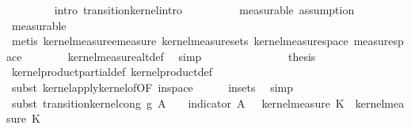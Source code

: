 \begin{isabellebody}
\ \ \ \ \ \ \ \isamarkupfalse%
\ {\isacharparenleft}{\kern0pt}intro\ transition{\isacharunderscore}{\kern0pt}kernel{\isachardot}{\kern0pt}intro{\isacharparenright}{\kern0pt}\isanewline
\ \ \ \ \ \ \ \ \isamarkupfalse%
\ {\isacharparenleft}{\kern0pt}measurable{\isacharcomma}{\kern0pt}\ assumption{\isacharparenright}{\kern0pt}\isanewline
\ \ \ \ \ \ \ \ \isamarkupfalse%
\ measurable\isanewline
\ \ \ \ \ \ \ \isamarkupfalse%
\ {\isacharparenleft}{\kern0pt}metis\ kernel{\isacharunderscore}{\kern0pt}measure{\isacharunderscore}{\kern0pt}emeasure\ kernel{\isacharunderscore}{\kern0pt}measure{\isacharunderscore}{\kern0pt}sets\ kernel{\isacharunderscore}{\kern0pt}measure{\isacharunderscore}{\kern0pt}space\ measure{\isacharunderscore}{\kern0pt}space{\isacharparenright}{\kern0pt}\isanewline
\ \ \ \ \ \ \isamarkupfalse%
\ kernel{\isacharunderscore}{\kern0pt}measure{\isacharunderscore}{\kern0pt}altdef\ \isamarkupfalse%
\ simp\isanewline
\ \ \ \ \ \ \isamarkupfalse%
\isanewline
\ \ \ \ \isamarkupfalse%
\isanewline
\ \ \isamarkupfalse%
\ {\isacharquery}{\kern0pt}thesis\isanewline
\ \ \ \ \isamarkupfalse%
\ kernel{\isacharunderscore}{\kern0pt}product{\isacharunderscore}{\kern0pt}partial{\isacharunderscore}{\kern0pt}def\ kernel{\isacharunderscore}{\kern0pt}product{\isacharunderscore}{\kern0pt}def\isanewline
\ \ \isamarkupfalse%
\ {\isacharparenleft}{\kern0pt}subst\ kernel{\isacharunderscore}{\kern0pt}apply{\isacharunderscore}{\kern0pt}kernel{\isacharunderscore}{\kern0pt}of{\isacharbrackleft}{\kern0pt}OF\ in{\isacharunderscore}{\kern0pt}space{\isacharbrackright}{\kern0pt}{\isacharparenright}{\kern0pt}\isanewline
\ \ \ \ \isamarkupfalse%
\ in{\isacharunderscore}{\kern0pt}sets\ \isamarkupfalse%
\ simp\isanewline
\ \ \ \ \ \isamarkupfalse%
\ {\isacharparenleft}{\kern0pt}subst\ transition{\isacharunderscore}{\kern0pt}kernel{\isacharunderscore}{\kern0pt}cong{\isacharbrackleft}{\kern0pt}\ g{\isacharequal}{\kern0pt}{\isachardoublequoteopen}{\isasymlambda}{\isasymomega}\ A{\isachardot}{\kern0pt}{\isasymintegral}\isactrlsup {\isacharplus}{\kern0pt}\ {\isasymomega}\ {\isasymintegral}\isactrlsup {\isacharplus}{\kern0pt}\ {\isasymomega}\ indicator\ A\ {\isacharparenleft}{\kern0pt}{\isasymomega}\ {\isasymomega}\ {\isasympartial}kernel{\isacharunderscore}{\kern0pt}measure\ K{\isacharunderscore}{\kern0pt}{}\ {\isasymomega}\ {\isasympartial}kernel{\isacharunderscore}{\kern0pt}measure\ K{\isacharunderscore}{\kern0pt}{}\ {\isasymomega}\isanewline

\end{isabellebody}
